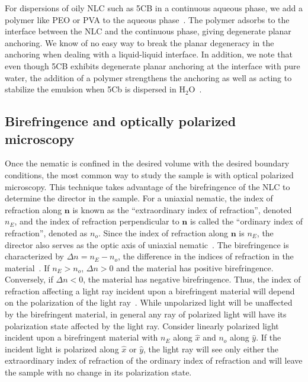 For dispersions of oily NLC such as 5CB in a continuous aqueous phase, we add a polymer like PEO or PVA to the aqueous phase~\cite{RN105,RN93}.
The polymer adsorbs to the interface between the NLC and the continuous phase, giving degenerate planar anchoring.
We know of no easy way to break the planar degeneracy in the anchoring when dealing with a liquid-liquid interface.
In addition, we note that even though 5CB exhibits degenerate planar anchoring at the interface with pure water, the addition of a polymer strengthens the anchoring as well as acting to stabilize the emulsion when 5Cb is dispersed in H$_2$O~\cite{RN105,RN93}.\\




\subsection{Birefringence and optically polarized microscopy}
Once the nematic is confined in the desired volume with the desired boundary conditions, the most common way to study the sample is with optical polarized microscopy.
This technique takes advantage of the birefringence of the NLC to determine the director in the sample.
For a uniaxial nematic, the index of refraction along $\mathbf{n}$ is known as the ``extraordinary index of refraction'', denoted $n_E$, and the index of refraction perpendicular to $\mathbf{n}$ is called the ``ordinary index of refraction'', denoted as $n_o$.
Since the index of refraction along $\mathbf{n}$ is $n_E$, the director also serves as the optic axis of uniaxial nematic~\cite{RN232}.
The birefringence is characterized by $\Delta n = n_E-n_o$, the difference in the indices of refraction in the material~\cite{RN232}.
If $n_E > n_o$, $\Delta n > 0$ and the material has positive birefringence.
Conversely, if $\Delta n < 0$, the material has negative birefringence.
Thus, the index of refraction affecting a light ray incident upon a birefringent material will depend on the polarization of the light ray~\cite{RN232}.
While unpolarized light will be unaffected by the birefringent material, in general any ray of polarized light will have its polarization state affected by the light ray.
Consider linearly polarized light incident upon a birefringent material with $n_E$ along $\hat{x}$ and $n_o$ along $\hat{y}$.
If the incident light is polarized along $\hat{x}$ or $\hat{y}$, the light ray will see only either the extraordinary index of refraction of the ordinary index of refraction and will leave the sample with no change in its polarization state.
